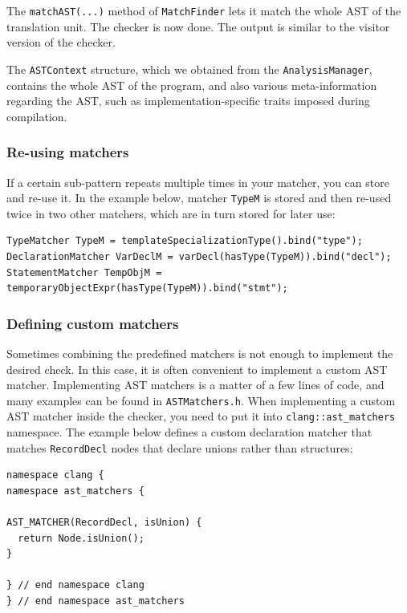 \documentclass[a4paper,12pt]{article}
\newenvironment{nobr}{\begin{minipage}{\textwidth}\setlength\parskip{1em}
}{\end{minipage}\ignorespacesafterend}
\begin{document}
The \lstinline|matchAST(...)| method of \lstinline|MatchFinder| lets it match the whole AST of the translation unit. The check\-er is now done. The output is similar to the visitor version of the checker.

The \lstinline|ASTContext| structure, which we obtained from the \lstinline|AnalysisManager|, contains the whole AST of the program, and also various meta-information regarding the AST, such as implementation-specific traits imposed during compilation.

\begin{nobr}
\subsubsection{Re-using matchers}

If a certain sub-pattern repeats multiple times in your matcher, you can store and re-use it. In the example below, matcher \lstinline|TypeM| is stored and then re-used twice in two other matchers, which are in turn stored for later use:

\begin{lstlisting}[style=cplusplus]
TypeMatcher TypeM = templateSpecializationType().bind("type");
DeclarationMatcher VarDeclM = varDecl(hasType(TypeM)).bind("decl");
StatementMatcher TempObjM = temporaryObjectExpr(hasType(TypeM)).bind("stmt");
\end{lstlisting}
\end{nobr}



\begin{nobr}
\subsubsection{Defining custom matchers}

Sometimes combining the predefined matchers is not enough to implement the desired check. In this case, it is often convenient to implement a custom AST matcher. Implementing AST matchers is a matter of a few lines of code, and many examples can be found in \lstinline|ASTMatchers.h|. When implementing a custom AST matcher inside the checker, you need to put it into \lstinline|clang::ast_matchers| namespace. The example below defines a custom declaration matcher that matches \lstinline|RecordDecl| nodes that declare unions rather than structures:

\begin{lstlisting}[style=cplusplus]
namespace clang {
namespace ast_matchers {

AST_MATCHER(RecordDecl, isUnion) {
  return Node.isUnion();
}

} // end namespace clang
} // end namespace ast_matchers
\end{lstlisting}
\end{nobr}
\end{document}
